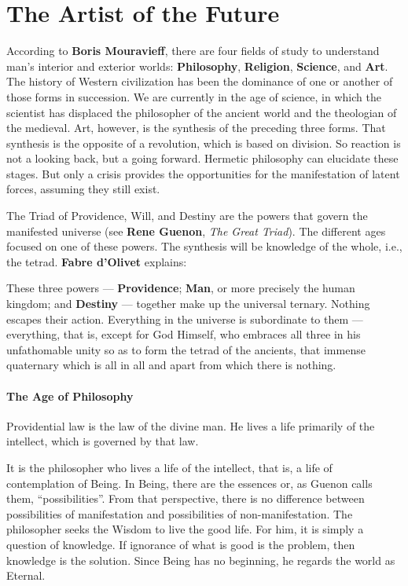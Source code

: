 \section{The Artist of the Future}

According to \textbf{Boris Mouravieff}, there are four fields of study to understand man's interior and exterior worlds: \textbf{Philosophy}, \textbf{Religion}, \textbf{Science}, and \textbf{Art}. The history of Western civilization has been the dominance of one or another of those forms in succession. We are currently in the age of science, in which the scientist has displaced the philosopher of the ancient world and the theologian of the medieval. Art, however, is the synthesis of the preceding three forms. That synthesis is the opposite of a revolution, which is based on division. So reaction is not a looking back, but a going forward. Hermetic philosophy can elucidate these stages. But only a crisis provides the opportunities for the manifestation of latent forces, assuming they still exist.

The Triad of Providence, Will, and Destiny are the powers that govern the manifested universe (see \textbf{Rene Guenon}, \emph{The Great Triad}). The different ages focused on one of these powers. The synthesis will be knowledge of the whole, i.e., the tetrad.
\textbf{Fabre d'Olivet} explains:


\begin{quotex}
These three powers --- \textbf{Providence}; \textbf{Man}, or more precisely the human kingdom; and \textbf{Destiny} --- together make up the universal ternary. Nothing escapes their action. Everything in the universe is subordinate to them --- everything, that is, except for God Himself, who embraces all three in his unfathomable unity so as to form the tetrad of the ancients, that immense quaternary which is all in all and apart from which there is nothing.
\end{quotex}


\paragraph{The Age of Philosophy}


\begin{quotex}
Providential law is the law of the divine man. He lives a life primarily of the intellect, which is governed by that law.
\end{quotex}


It is the philosopher who lives a life of the intellect, that is, a life of contemplation of Being. In Being, there are the essences or, as Guenon calls them, ``possibilities''. From that perspective, there is no difference between possibilities of manifestation and possibilities of non-manifestation. The philosopher seeks the Wisdom to live the good life. For him, it is simply a question of knowledge. If ignorance of what is good is the problem, then knowledge is the solution. Since Being has no beginning, he regards the world as Eternal.

